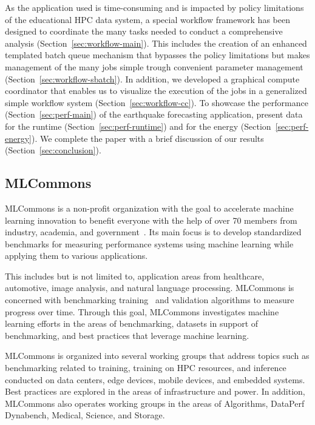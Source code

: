 \documentclass[utf8]{FrontiersinVancouver} %
\begin{document}
As the application used is time-consuming and is impacted by policy
limitations of the educational HPC data system, a special workflow
framework has been designed to coordinate the many tasks needed to
conduct a comprehensive analysis
(Section~\ref{sec:workflow-main}). This includes the creation of an
enhanced templated batch queue mechanism that bypasses the policy
limitations but makes management of the many jobs simple trough
convenient parameter management (Section~\ref{sec:workflow-sbatch}). In
addition, we developed a graphical compute coordinator that enables us to
visualize the execution of the jobs in a generalized simple workflow
system (Section~\ref{sec:workflow-cc}).  To showcase the performance
(Section~\ref{sec:perf-main}) of the earthquake forecasting
application, present data for the runtime
(Section~\ref{sec:perf-runtime}) and for the energy
(Section~\ref{sec:perf-energy}). We complete the paper with a brief discussion of our results
(Section~\ref{sec:conclusion}).


\subsection{MLCommons}
\label{sec:mlcommons}

MLCommons is a non-profit organization with the goal to accelerate
machine learning innovation to benefit everyone with the help of over
70 members from industry, academia, and
government~\citep{www-mlcommons}.  Its main focus is to develop
standardized benchmarks for measuring performance systems using
machine learning while applying them to various applications.

This includes but is not limited to, application areas from
healthcare, automotive, image analysis, and natural language
processing. MLCommons is concerned with benchmarking
training~\citep{mlperf-training} and validation algorithms to measure
progress over time. Through this goal, MLCommons investigates machine
learning efforts in the areas of benchmarking, datasets in support of
benchmarking, and best practices that leverage machine learning. 

MLCommons is organized into several
working groups that address topics such as benchmarking related to
training, training on HPC resources, and inference conducted on data
centers, edge devices, mobile devices, and embedded systems. Best
practices are explored in the areas of infrastructure and power. In
addition, MLCommons also operates working groups in the areas of
Algorithms, DataPerf Dynabench, Medical, Science, and Storage.
\end{document}
